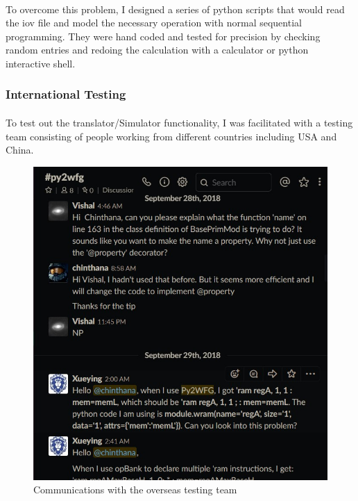 \paragraph{}
To overcome this problem, I designed a series of python scripts that would read the iov file and model the necessary operation with normal sequential programming. They were hand coded and tested for precision by checking random entries and redoing the calculation with a calculator or python interactive shell.

\subsubsection{International Testing}
\paragraph{}
To test out the translator/Simulator functionality, I was facilitated with a testing team consisting of people working from different countries including USA and China.

\begin{figure}[H]
    \centering
    \includegraphics[trim=0cm 0cm 0cm 0cm, clip=true,scale=0.5]{figures/global_team.jpg}
    \caption{Communications with the overseas testing team\label{Fig:globalteam}}\vspace{-4mm}
    \end{figure}

